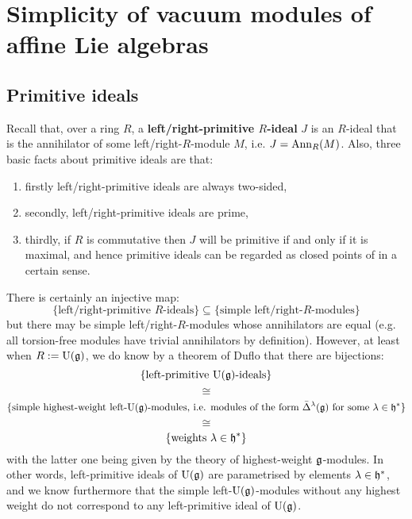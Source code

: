 \section{Simplicity of vacuum modules of affine Lie algebras}
    \subsection{Primitive ideals}
        Recall that, over a ring $R$, a \textbf{left/right-primitive $R$-ideal} $J$ is an $R$-ideal that is the annihilator of some left/right-$R$-module $M$, i.e. $J = \mathrm{Ann}_R(M)$. Also, three basic facts about primitive ideals are that:
        \begin{enumerate}
            \item firstly left/right-primitive ideals are always two-sided,
            \item secondly, left/right-primitive ideals are prime,
            \item thirdly, if $R$ is commutative then $J$ will be primitive if and only if it is maximal, and hence primitive ideals can be regarded as closed points of  in a certain sense.
        \end{enumerate}
        \begin{remark}
            There is certainly an injective map:
                $$\{ \text{left/right-primitive $R$-ideals} \} \subseteq \{ \text{simple left/right-$R$-modules} \}$$
            but there may be simple left/right-$R$-modules whose annihilators are equal (e.g. all torsion-free modules have trivial annihilators by definition). However, at least when $R := \mathrm{U}(\mathfrak{g})$, we do know by a theorem of Duflo  that there are bijections:
                $$\{ \text{left-primitive $\mathrm{U}(\mathfrak{g})$-ideals} \}$$
                $$\cong$$
                $$\{ \text{simple highest-weight left-$\mathrm{U}(\mathfrak{g})$-modules, i.e. modules of the form $\bar{\Delta}^{\lambda}(\mathfrak{g})$ for some $\lambda \in \mathfrak{h}^*$} \}$$
                $$\cong$$
                $$\{ \text{weights $\lambda \in \mathfrak{h}^* $} \}$$
            with the latter one being given by the theory of highest-weight $\mathfrak{g}$-modules. In other words, left-primitive ideals of $\mathrm{U}(\mathfrak{g})$ are parametrised by elements $\lambda \in \mathfrak{h}^*$, and we know furthermore that the simple left-$\mathrm{U}(\mathfrak{g})$-modules without any highest weight do not correspond to any left-primitive ideal of $\mathrm{U}(\mathfrak{g})$.
        \end{remark}

